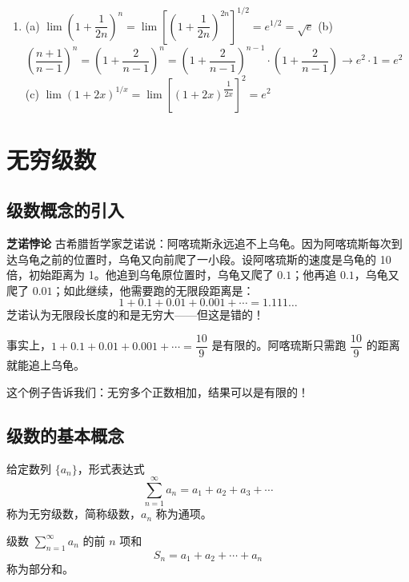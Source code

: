 \documentclass{ctexart}
\newenvironment{custom}[1]{\par\noindent \textbf{#1}\quad}{\par\vspace{1em}}
\begin{document}
\begin{example}[加减结构中的错误示例]
\begin{enumerate}
\item[10.] 
   (a) \(\lim\left(1+\dfrac{1}{2n}\right)^n = \lim\left[\left(1+\dfrac{1}{2n}\right)^{2n}\right]^{1/2} = e^{1/2} = \sqrt{e}\) \quad
   (b) \(\left(\dfrac{n+1}{n-1}\right)^n = \left(1 + \dfrac{2}{n-1}\right)^n = \left(1 + \dfrac{2}{n-1}\right)^{n-1} \cdot \left(1 + \dfrac{2}{n-1}\right) \to e^2 \cdot 1 = e^2\) \quad
   (c) \(\lim (1+2x)^{1/x} = \lim \left[(1+2x)^{\dfrac{1}{2x}}\right]^2 = e^2\)
\end{enumerate}
\end{custom}

\clearpage
\section{无穷级数}

\subsection{级数概念的引入}

\begin{custom}{芝诺悖论}
古希腊哲学家芝诺说：阿喀琉斯永远追不上乌龟。因为阿喀琉斯每次到达乌龟之前的位置时，乌龟又向前爬了一小段。设阿喀琉斯的速度是乌龟的 10 倍，初始距离为 1。他追到乌龟原位置时，乌龟又爬了 \(0.1\)；他再追 \(0.1\)，乌龟又爬了 \(0.01\)；如此继续，他需要跑的无限段距离是：
\[
1 + 0.1 + 0.01 + 0.001 + \cdots = 1.111\ldots
\]
芝诺认为无限段长度的和是无穷大——但这是错的！

事实上，\(1 + 0.1 + 0.01 + 0.001 + \cdots = \dfrac{10}{9}\) 是有限的。阿喀琉斯只需跑 \(\dfrac{10}{9}\) 的距离就能追上乌龟。
\end{custom}

这个例子告诉我们：无穷多个正数相加，结果可以是有限的！

\subsection{级数的基本概念}

\begin{definition}[常数项级数]
给定数列 \(\{a_n\}\)，形式表达式
\[
\sum_{n=1}^{\infty} a_n = a_1 + a_2 + a_3 + \cdots
\]
称为无穷级数，简称级数，\(a_n\) 称为通项。
\end{definition}

\begin{definition}[部分和]
级数 \(\sum_{n=1}^{\infty} a_n\) 的前 \(n\) 项和
\[
S_n = a_1 + a_2 + \cdots + a_n
\]
称为部分和。
\end{definition}


\end{example}
\end{document}
